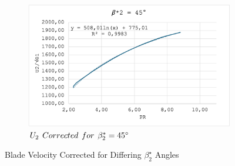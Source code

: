 \documentclass[12pt, letter]{report}
\begin{document}
\begin{figure}[H]
  \vspace{20pt}
  
  \begin{subfigure}{0.49\linewidth}
    \includegraphics[width=\linewidth]{figures/B2=45.png}
    \caption{$U_2 \hspace{0.15cm} Corrected \hspace{0.15cm} for \hspace{0.15cm} \beta_2^*=45\degree$ \cite{lectureslides}}
    \label{fig:U2 Correcte B=45}
  \end{subfigure}
  \hfill

  \caption{Blade Velocity Corrected for Differing $\beta_{2}^{\star}$ Angles}
  \label{fig:Blade Velocity Corrected for Differing  Angles}
\end{figure}
\end{document}
